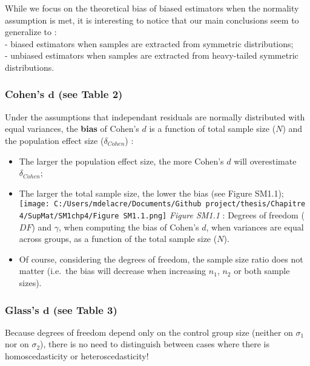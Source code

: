 \documentclass[
  english,
  man,mask,floatsintext]{apa6}
\begin{document}
While we focus on the theoretical bias of biased estimators when the normality assumption is met, it is interesting to notice that our main conclusions seem to generalize to :\\
- biased estimators when samples are extracted from symmetric distributions;\\
- unbiased estimators when samples are extracted from heavy-tailed symmetric distributions.

\hypertarget{cohens-bmd-see-table-2}{%
\subsubsection{\texorpdfstring{Cohen's \(\bm{d}\) (see Table 2)}{Cohen's \textbackslash bm\{d\} (see Table 2)}}\label{cohens-bmd-see-table-2}}

Under the assumptions that independant residuals are normally distributed with equal variances, the \textbf{bias} of Cohen's \(d\) is a function of total sample size (\(N\)) and the population effect size (\(\delta_{Cohen}\)) :

\begin{itemize}
\item
  The larger the population effect size, the more Cohen's \(d\) will overestimate \(\delta_{Cohen}\);\\
\item
  The larger the total sample size, the lower the bias (see Figure SM1.1);
  \texttt{[image: C:/Users/mdelacre/Documents/Github project/thesis/Chapitre 4/SupMat/SM1chp4/Figure SM1.1.png]}
  \emph{Figure SM1.1} : Degrees of freedom (\(DF\)) and \(\gamma\), when computing the bias of Cohen's \(d\), when variances are equal across groups, as a function of the total sample size (\(N\)).
\item
  Of course, considering the degrees of freedom, the sample size ratio does not matter (i.e.~the bias will decrease when increasing \(n_1\), \(n_2\) or both sample sizes).
\end{itemize}

\newpage

\hypertarget{glasss-bmd-see-table-3}{%
\subsubsection{\texorpdfstring{Glass's \(\bm{d}\) (see Table 3)}{Glass's \textbackslash bm\{d\} (see Table 3)}}\label{glasss-bmd-see-table-3}}

Because degrees of freedom depend only on the control group size (neither on \(\sigma_1\) nor on \(\sigma_2\)), there is no need to distinguish between cases where there is homoscedasticity or heteroscedasticity!
\end{document}
